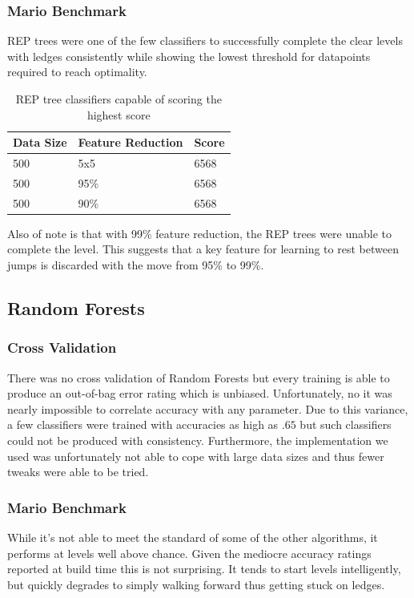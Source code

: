 \documentclass[]{article}   %
\begin{document}
\subsubsection{Mario Benchmark}
REP trees were one of the few classifiers to successfully complete the clear levels with ledges consistently while showing the lowest threshold for
datapoints required to reach optimality. 

\begin{table}[h!]
	\begin{center}
		\caption{REP tree classifiers capable of scoring the highest score}
		\begin{tabular}{l | l || l  }
		\hline
		Data Size & Feature Reduction & Score \\
		\hline
		500 & 5x5 & 6568 \\
		500 & 95\% & 6568 \\
		500 & 90\% & 6568 \\
		\hline
		\end{tabular}
	\end{center}
\end{table}

Also of note is that with 99\% feature reduction, the REP trees were unable to complete the level. This suggests that a key feature for learning to 
rest between jumps is discarded with the move from 95\% to 99\%.

\subsection{Random Forests}
\subsubsection{Cross Validation}
There was no cross validation of Random Forests but every training is able to produce an out-of-bag error rating which is unbiased.  Unfortunately, no it was nearly impossible to correlate accuracy with any parameter. Due to this variance, a few classifiers were trained with accuracies as high as $.65$ but such classifiers could not be produced with consistency.  Furthermore, the implementation we used was unfortunately not able to cope with large data sizes and thus fewer tweaks were able to be tried.
\subsubsection{Mario Benchmark}
While it's not able to meet the standard of some of the other algorithms, it performs at levels well above chance.  Given the mediocre accuracy ratings reported at build time this is not surprising.  It tends to start levels intelligently, but quickly degrades to simply walking forward thus getting stuck on ledges.
\end{document}
